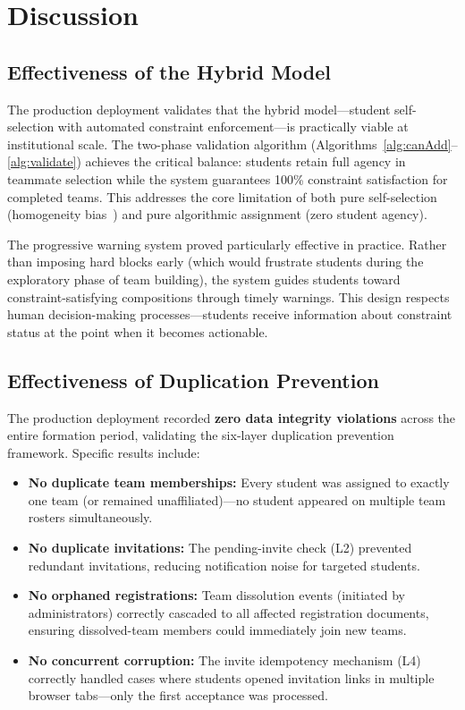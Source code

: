 \documentclass[conference]{IEEEtran}
\begin{document}
\section{Discussion}
\label{sec:discussion}

\subsection{Effectiveness of the Hybrid Model}

The production deployment validates that the hybrid model---student self-selection with automated constraint enforcement---is practically viable at institutional scale. The two-phase validation algorithm (Algorithms~\ref{alg:canAdd}--\ref{alg:validate}) achieves the critical balance: students retain full agency in teammate selection while the system guarantees 100\% constraint satisfaction for completed teams. This addresses the core limitation of both pure self-selection (homogeneity bias~\cite{bacon2004}) and pure algorithmic assignment (zero student agency).

The progressive warning system proved particularly effective in practice. Rather than imposing hard blocks early (which would frustrate students during the exploratory phase of team building), the system guides students toward constraint-satisfying compositions through timely warnings. This design respects human decision-making processes---students receive information about constraint status at the point when it becomes actionable.

\subsection{Effectiveness of Duplication Prevention}

The production deployment recorded \textbf{zero data integrity violations} across the entire formation period, validating the six-layer duplication prevention framework. Specific results include:

\begin{itemize}[noitemsep,topsep=3pt]
    \item \textbf{No duplicate team memberships:} Every student was assigned to exactly one team (or remained unaffiliated)---no student appeared on multiple team rosters simultaneously.
    \item \textbf{No duplicate invitations:} The pending-invite check (L2) prevented redundant invitations, reducing notification noise for targeted students.
    \item \textbf{No orphaned registrations:} Team dissolution events (initiated by administrators) correctly cascaded to all affected registration documents, ensuring dissolved-team members could immediately join new teams.
    \item \textbf{No concurrent corruption:} The invite idempotency mechanism (L4) correctly handled cases where students opened invitation links in multiple browser tabs---only the first acceptance was processed.
\end{itemize}
\end{document}
